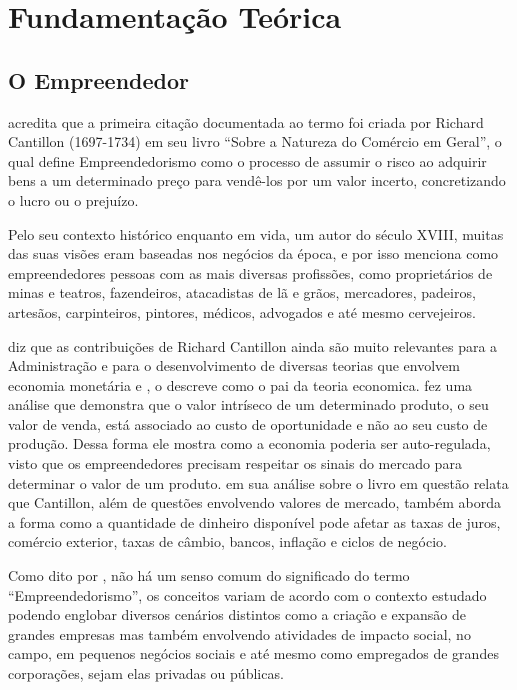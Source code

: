 \chapter[Fundamentação Teórica]{Fundamentação Teórica}
\label{cap-fundamentacao_teorica}

\section{O Empreendedor}
\label{section:o empreendedor}

\cite{Brown2013} acredita que a primeira citação documentada ao termo foi criada por Richard Cantillon (1697-1734) em seu livro ``Sobre a Natureza do Comércio em Geral'', o qual define Empreendedorismo como o processo de assumir o risco ao adquirir bens a um determinado preço para vendê-los por um valor incerto, concretizando o lucro ou o prejuízo. 

Pelo seu contexto histórico enquanto em vida, um autor do século XVIII, muitas das suas visões eram baseadas nos negócios da época, e por isso menciona como empreendedores pessoas com as mais diversas profissões, como proprietários de minas e teatros, fazendeiros, atacadistas de lã e grãos, mercadores, padeiros, artesãos, carpinteiros, pintores, médicos, advogados e até mesmo cervejeiros. 

\cite{Murphy1987} diz que as contribuições de Richard Cantillon ainda são muito relevantes para a Administração e para o desenvolvimento de diversas teorias que envolvem economia monetária e , \cite{Brown2013} o descreve como o pai da teoria economica. \cite{James1953} fez uma análise que demonstra que o valor intríseco de um determinado produto, o seu valor de venda, está associado ao custo de oportunidade e não ao seu custo de produção. Dessa forma ele mostra como a economia poderia ser auto-regulada, visto que os empreendedores precisam respeitar os sinais do mercado para determinar o valor de um produto. \cite{Brown2013} em sua análise sobre o livro em questão relata que Cantillon, além de questões envolvendo valores de mercado, também aborda a forma como a quantidade de dinheiro disponível pode afetar as taxas de juros, comércio exterior, taxas de câmbio, bancos, inflação e ciclos de negócio.

Como dito por \cite{Wallevik2016}, não há um senso comum do significado do termo ``Empreendedorismo'', os conceitos variam de acordo com o contexto estudado podendo englobar diversos cenários distintos como a criação e expansão de grandes empresas mas também envolvendo atividades de impacto social, no campo, em pequenos negócios sociais e até mesmo como empregados de grandes corporações, sejam elas privadas ou públicas.

